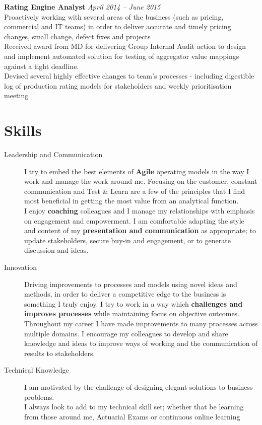 \documentclass[11pt]{article}
\begin{document}
\begin{description}
\textbf{Rating Engine Analyst} \emph{April 2014 -- June 2015}\\
\textbullet \quad Proactively working with several areas of the business (such as pricing, commercial and IT teams) in order to deliver accurate and timely pricing changes, small change, defect fixes and projects\\
\textbullet \quad Received award from MD for delivering Group Internal Audit action to design and implement automated solution for testing of aggregator value mappings against a tight deadline.\\
\textbullet \quad Devised several highly effective changes to team's processes - including digestible log of production rating models for stakeholders and weekly prioritisation meeting \\
\end{description}

\section*{Skills}
\begin{description}
\item[Leadership and Communication] I try to embed the best elements of \textbf{Agile} operating models in the way I work and manage the work around me.  Focusing on the customer, constant communication and Test \& Learn are a few of the principles that I find most beneficial in getting the most value from an analytical function.\\
I enjoy \textbf{coaching} colleagues and I manage my relationships with emphasis on engagement and empowerment.
I am comfortable adapting the style and content of my \textbf{presentation and communication} as appropriate; to update stakeholders, secure buy-in and engagement, or to generate discussion and ideas. 
\item[Innovation] Driving improvements to processes and models using novel ideas and methods, in order to deliver a competitive edge to the business is something I truly enjoy. 
I try to work in a way which \textbf{challenges and improves processes} while maintaining focus on objective outcomes.\\
Throughout my career I have made improvements to many processes across multiple domains. I encourage my colleagues to develop and share knowledge and ideas to improve ways of working and the communication of results to stakeholders.
\item[Technical Knowledge] I am motivated by the challenge of designing elegant solutions to business problems.\\
I always look to add to my technical skill set; whether that be learning from those around me, Actuarial Exams or continuous online learning

\end{description} 
\end{document}
